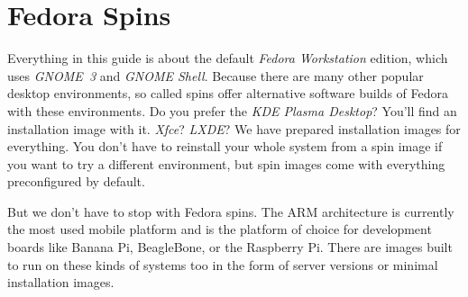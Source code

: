 \section*{Fedora Spins}

Everything in this guide is about the default \emph{Fedora Workstation} edition, which uses \emph{GNOME~3} and \emph{GNOME Shell}. Because there are many other popular desktop environments, so called spins offer alternative software builds of Fedora with these environments. Do you prefer the \emph{KDE Plasma Desktop}? You'll find an installation image with it. \emph{Xfce}? \emph{LXDE}? We have prepared installation images for everything. You don't have to reinstall your whole system from a spin image if you want to try a different environment, but spin images come with everything preconfigured by default.

But we don't have to stop with Fedora spins. The ARM architecture is currently the most used mobile platform and is the platform of choice for development boards like Banana Pi, BeagleBone, or the Raspberry Pi. There are images built to run on these kinds of systems too in the form of server versions or minimal installation images.
\endinput
